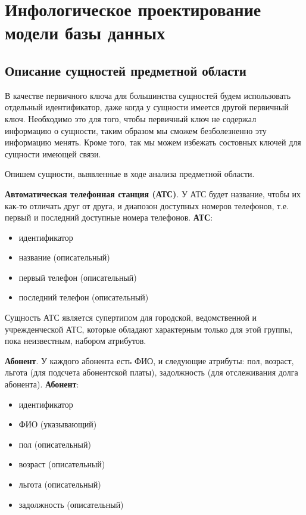 \documentclass{report}
\begin{document}
\chapter{Инфологическое проектирование модели базы данных}

\section{Описание сущностей предметной области}
В качестве первичного ключа для большинства сущностей будем использовать
отдельный идентификатор, даже когда у сущности имеется другой первичный ключ.
Необходимо это для того, чтобы первичный ключ не содержал информацию
о сущности, таким образом мы сможем безболезненно эту информацию
менять. Кроме того, так мы можем избежать состовных ключей для 
сущности имеющей связи.

Опишем сущности, выявленные в ходе анализа предметной области.

\textbf{Автоматическая телефонная станция (АТС)}. У АТС будет название, чтобы
их как-то отличать друг от друга, и диапозон доступных номеров телефонов, 
т.е. первый и последний доступные номера телефонов. 
\newline\textbf{АТС}:
\begin{itemize}
    \item идентификатор
    \item название (описательный)
    \item первый телефон (описательный)
    \item последний телефон (описательный)
\end{itemize}
Сущность АТС является супертипом для городской, 
ведомственной и учрежден\-чес\-кой АТС, которые обладают характерным только 
для этой группы, пока неизвестным, набором атрибутов.

\textbf{Абонент}. У каждого абонента есть ФИО, 
и следующие атрибуты: пол, возраст, льгота (для подсчета 
абонентской платы), задолжность (для отслеживания долга абонента). 
\newline\textbf{Абонент}:
\begin{itemize}
    \item идентификатор
    \item ФИО (указывающий)
    \item пол (описательный)
    \item возраст (описательный)
    \item льгота (описательный)
    \item задолжность (описательный)
\end{itemize}
\end{document}
